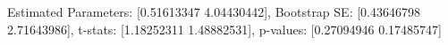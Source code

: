 Estimated Parameters: [0.51613347 4.04430442], Bootstrap SE: [0.43646798 2.71643986], t-stats: [1.18252311 1.48882531], p-values: [0.27094946 0.17485747]